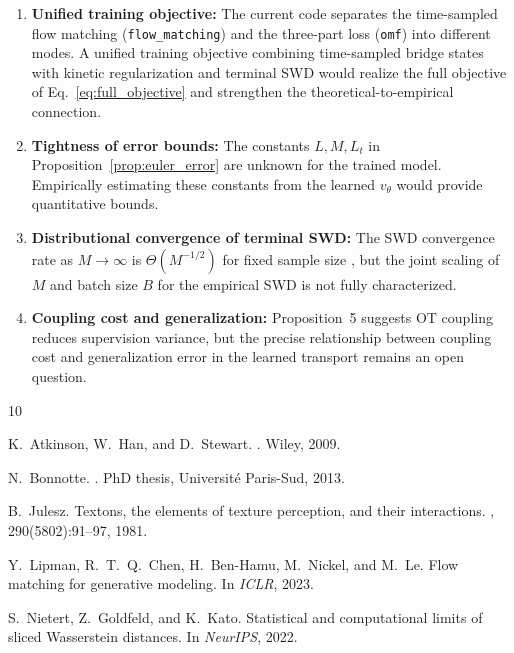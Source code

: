 \documentclass[letterpaper]{article}
\begin{document}
\begin{enumerate}
    \item \textbf{Unified training objective:} The current code separates
    the time-sampled flow matching (\texttt{flow\_matching}) and the
    three-part loss (\texttt{omf}) into different modes. A unified training
    objective combining time-sampled bridge states with kinetic regularization
    and terminal SWD would realize the full objective of Eq.~\eqref{eq:full_objective}
    and strengthen the theoretical-to-empirical connection.

    \item \textbf{Tightness of error bounds:} The constants $L, M, L_t$ in
    Proposition~\ref{prop:euler_error} are unknown for the trained model.
    Empirically estimating these constants from the learned $v_\theta$
    would provide quantitative bounds.

    \item \textbf{Distributional convergence of terminal SWD:} The SWD
    convergence rate as $M \to \infty$ is $\Theta(M^{-1/2})$ for fixed
    sample size \cite{nietert2022wasserstein}, but the joint scaling of
    $M$ and batch size $B$ for the empirical SWD is not fully characterized.

    \item \textbf{Coupling cost and generalization:} Proposition~5 suggests
    OT coupling reduces supervision variance, but the precise relationship
    between coupling cost and generalization error in the learned transport
    remains an open question.
\end{enumerate}


\begin{thebibliography}{10}

K.~Atkinson, W.~Han, and D.~Stewart.
.
\newblock Wiley, 2009.

N.~Bonnotte.
.
\newblock PhD thesis, Universit\'e Paris-Sud, 2013.

B.~Julesz.
\newblock Textons, the elements of texture perception, and their interactions.
, 290(5802):91--97, 1981.

Y.~Lipman, R.~T.~Q.~Chen, H.~Ben-Hamu, M.~Nickel, and M.~Le.
\newblock Flow matching for generative modeling.
\newblock In {\em ICLR}, 2023.

S.~Nietert, Z.~Goldfeld, and K.~Kato.
\newblock Statistical and computational limits of sliced Wasserstein distances.
\newblock In {\em NeurIPS}, 2022.

\end{thebibliography}
\end{document}
